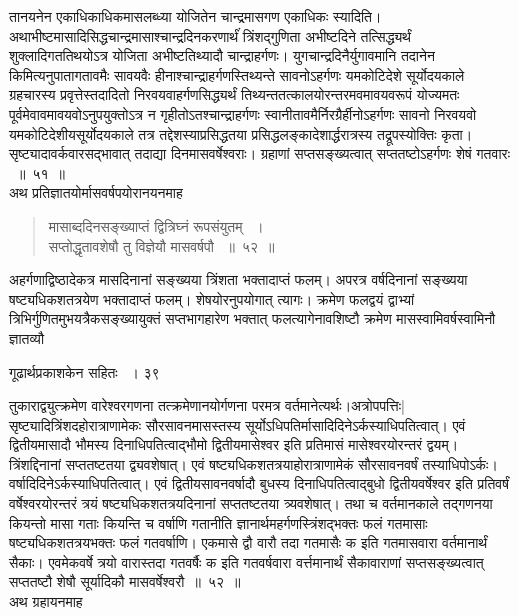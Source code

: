 \documentclass[11pt, openany]{book}
\begin{document}
\begin{sloppypar}
\noindent तानयनेन एकाधिकाधिकमासलब्ध्या योजितेन चान्द्रमासगण एकाधिकः स्यादिति। अथाभीष्टमासादिसिद्धचान्द्रमासाश्चान्द्रदिनकरणार्थंं त्रिंशद्गुणिता अभीष्टदिने तत्सिद्ध्यर्थं शुक्लादिगततिथयोऽत्र योजिता अभीष्टतिथ्यादौ चान्द्राहर्गणः। युगचान्द्रदिनैर्युगावमानि तदानेन किमित्यनुपातागतावमैः सावयवैः हीनाश्चान्द्राहर्गणस्तिथ्यन्ते सावनोऽहर्गणः यमकोटिदेशे सूर्योदयकाले ग्रहचारस्य प्रवृत्तेस्तदादितो निरवयवाहर्गणसिद्ध्यर्थं तिथ्यन्ततत्कालयोरन्तरमवमावयवरूपं योज्यमतः पूर्वमेवावमावयवोऽनुपयुक्तोऽत्र न गृहीतोऽतश्चान्द्राहर्गणः स्वानीतावमैर्निरग्रैर्हीनोऽहर्गणः सावनो निरवयवो यमकोटिदेशीयसूर्योदयकाले तत्र तद्देशस्याप्रसिद्धतया प्रसिद्धलङ्कादेशार्द्धरात्रस्य तद्रूपस्योक्तिः कृता। सृष्ट्यादावर्कवारसद्भावात् तदाद्या दिनमासवर्षेश्वराः। ग्रहाणां सप्तसङ्ख्यत्वात् सप्ततष्टोऽहर्गणः शेषं गतवारः ~॥~५१~॥\\ 
\noindent अथ प्रतिज्ञातयोर्मासवर्षपयोरानयनमाह\textendash
\end{sloppypar}
\begin{quote}

 {\ssi मासाब्ददिनसङ्ख्याप्तं द्वित्रिघ्नं रूपसंयुतम् ~।\\
सप्तोद्धृतावशेषौ तु विज्ञेयौ मासवर्षपौ ~॥~५२~॥}
\end{quote}
 \begin{sloppypar}
 अहर्गणाद्विष्ठादेकत्र मासदिनानां सङ्ख्यया त्रिंशता भक्तादाप्तं फलम्। अपरत्र वर्षदिनानां सङ्ख्यया षष्ट्यधिकशतत्रयेण भक्तादाप्तं फलम्। शेषयोरनुपयोगात् त्यागः। क्रमेण फलद्वयं द्वाभ्यां त्रिभिर्गुणितमुभयत्रैकसङ्ख्यायुक्तं सप्तभागहारेण भक्तात् फलत्यागेनावशिष्टौ क्रमेण मासस्वामिवर्षस्वामिनौ ज्ञातव्यौ
\end{sloppypar}

\newpage

\hspace{3cm} गूढार्थप्रकाशकेन सहितः ~। \hfill ३९
\vspace{1cm}

\begin{sloppypar}
\noindent तुकाराद्व्युत्क्रमेण वारेश्वरगणना तत्क्रमेणानयोर्गणना परमत्र वर्तमानेत्यर्थः।अत्रोपपत्तिः| सृष्ट्यादित्रिंशदहोरात्राणामेकः सौरसावनमासस्तस्य सूर्योऽधिपतिर्मासादिदिनेऽर्कस्याधिपतित्वात्। एवं द्वितीयमासादौ भौमस्य दिनाधिपतित्वाद्भौमो द्वितीयमासेश्वर इति प्रतिमासं मासेश्वरयोरन्तरं द्वयम्। त्रिंशद्दिनानां सप्ततष्टतया द्व्यवशेषात्। एवं षष्ट्यधिकशतत्रयाहोरात्राणामेकं सौरसावनवर्षं तस्याधिपोऽर्कः। वर्षादिदिनेऽर्कस्याधिपतित्वात्। एवं द्वितीयसावनवर्षादौ बुधस्य दिनाधिपतित्वाद्बुधो द्वितीयवर्षेश्वर इति प्रतिवर्षं वर्षेश्वरयोरन्तरं त्रयं षष्ट्यधिकशतत्रयदिनानां सप्ततष्टतया त्र्यवशेषात्। तथा च वर्तमानकाले तद्गणनया कियन्तो मासा गताः कियन्ति च वर्षाणि गतानीति ज्ञानार्थमहर्गणस्त्रिंशद्भक्तः फलं गतमासाः षष्ट्यधिकशतत्रयभक्तः फलं गतवर्षाणि। एकमासे द्वौ वारौ तदा गतमासैः क इति गतमासवारा वर्तमानार्थं सैकाः। एवमेकवर्षे त्रयो वारास्तदा गतवर्षैः क इति गतवर्षवारा वर्त्तमानार्थं सैकावाराणां सप्तसङ्ख्यत्वात् सप्ततष्टौ शेषौ सूर्यादिकौ मासवर्षेश्वरौ~॥~५२~॥\\ 
\noindent अथ ग्रहायनमाह\textendash
\end{sloppypar}
\end{document}
